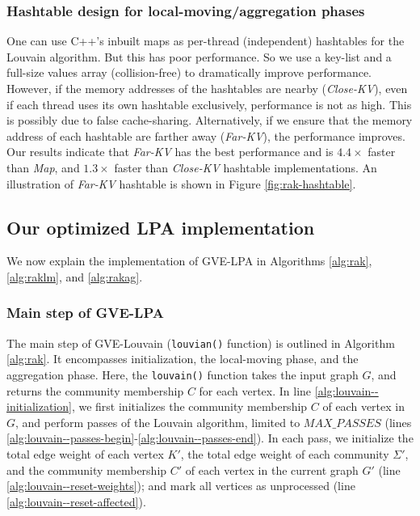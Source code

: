 \subsubsection{Hashtable design for local-moving/aggregation phases}

One can use C++'s inbuilt maps as per-thread (independent) hashtables for the Louvain algorithm. But this has poor performance. So we use a key-list and a full-size values array (collision-free) to dramatically improve performance. However, if the memory addresses of the hashtables are nearby (\textit{Close-KV}), even if each thread uses its own hashtable exclusively, performance is not as high. This is possibly due to false cache-sharing. Alternatively, if we ensure that the memory address of each hashtable are farther away (\textit{Far-KV}), the performance improves. Our results indicate that \textit{Far-KV} has the best performance and is $4.4\times$ faster than \textit{Map}, and $1.3\times$ faster than \textit{Close-KV} hashtable implementations. An illustration of \textit{Far-KV} hashtable is shown in Figure \ref{fig:rak-hashtable}.







\subsection{Our optimized LPA implementation}

We now explain the implementation of GVE-LPA in Algorithms \ref{alg:rak}, \ref{alg:raklm}, and \ref{alg:rakag}.


\subsubsection{Main step of GVE-LPA}

The main step of GVE-Louvain (\texttt{louvian()} function) is outlined in Algorithm \ref{alg:rak}. It encompasses initialization, the local-moving phase, and the aggregation phase. Here, the \texttt{louvain()} function takes the input graph $G$, and returns the community membership $C$ for each vertex. In line \ref{alg:louvain--initialization}, we first initializes the community membership $C$ of each vertex in $G$, and perform passes of the Louvain algorithm, limited to $MAX\_PASSES$ (lines \ref{alg:louvain--passes-begin}-\ref{alg:louvain--passes-end}). In each pass, we initialize the total edge weight of each vertex $K'$, the total edge weight of each community $\Sigma'$, and the community membership $C'$ of each vertex in the current graph $G'$ (line \ref{alg:louvain--reset-weights}); and mark all vertices as unprocessed (line \ref{alg:louvain--reset-affected}).

